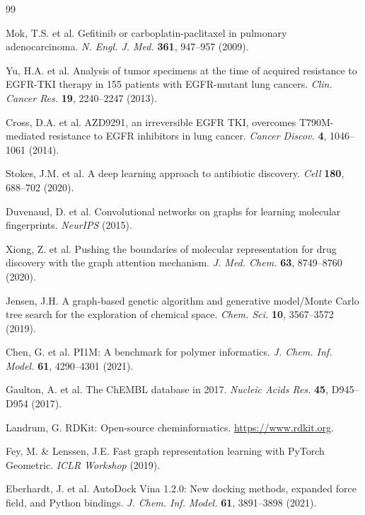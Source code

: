 \documentclass[11pt]{article}
\begin{document}

\begin{thebibliography}{99}

Mok, T.S. et al. Gefitinib or carboplatin-paclitaxel in pulmonary adenocarcinoma.
\textit{N. Engl. J. Med.} \textbf{361}, 947--957 (2009).

Yu, H.A. et al. Analysis of tumor specimens at the time of acquired resistance
to EGFR-TKI therapy in 155 patients with EGFR-mutant lung cancers.
\textit{Clin. Cancer Res.} \textbf{19}, 2240--2247 (2013).

Cross, D.A. et al. AZD9291, an irreversible EGFR TKI, overcomes T790M-mediated
resistance to EGFR inhibitors in lung cancer.
\textit{Cancer Discov.} \textbf{4}, 1046--1061 (2014).

Stokes, J.M. et al. A deep learning approach to antibiotic discovery.
\textit{Cell} \textbf{180}, 688--702 (2020).

Duvenaud, D. et al. Convolutional networks on graphs for learning molecular
fingerprints. \textit{NeurIPS} (2015).

Xiong, Z. et al. Pushing the boundaries of molecular representation for
drug discovery with the graph attention mechanism.
\textit{J. Med. Chem.} \textbf{63}, 8749--8760 (2020).

Jensen, J.H. A graph-based genetic algorithm and generative model/Monte Carlo
tree search for the exploration of chemical space.
\textit{Chem. Sci.} \textbf{10}, 3567--3572 (2019).

Chen, G. et al. PI1M: A benchmark for polymer informatics.
\textit{J. Chem. Inf. Model.} \textbf{61}, 4290--4301 (2021).

Gaulton, A. et al. The ChEMBL database in 2017.
\textit{Nucleic Acids Res.} \textbf{45}, D945--D954 (2017).

Landrum, G. RDKit: Open-source cheminformatics. \url{https://www.rdkit.org}.

Fey, M. \& Lenssen, J.E. Fast graph representation learning with PyTorch
Geometric. \textit{ICLR Workshop} (2019).

Eberhardt, J. et al. AutoDock Vina 1.2.0: New docking methods, expanded force
field, and Python bindings.
\textit{J. Chem. Inf. Model.} \textbf{61}, 3891--3898 (2021).

\end{thebibliography}
\end{document}
